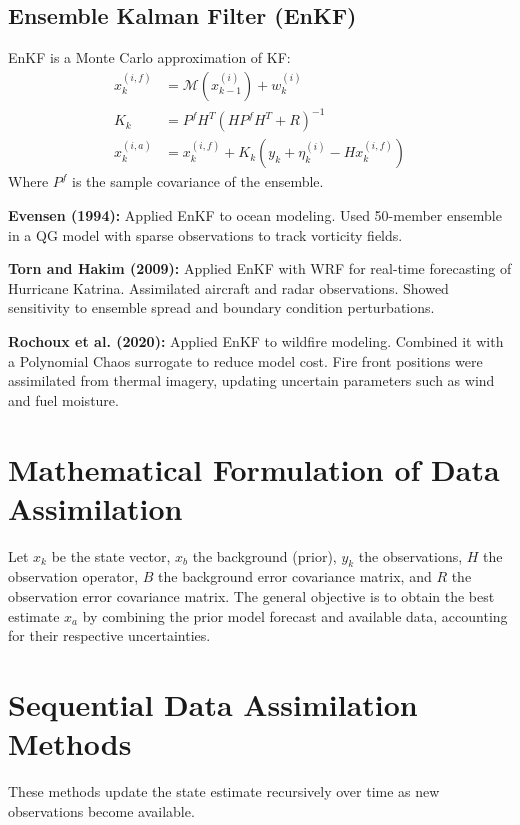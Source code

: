 \documentclass[a4paper]{article}
\begin{document}
\subsection{Ensemble Kalman Filter (EnKF)}

EnKF is a Monte Carlo approximation of KF:
\begin{align*}
x_k^{(i,f)} &= \mathcal{M}(x_{k-1}^{(i)}) + w_k^{(i)} \\
K_k &= P^f H^T (H P^f H^T + R)^{-1} \\
x_k^{(i,a)} &= x_k^{(i,f)} + K_k(y_k + \eta_k^{(i)} - H x_k^{(i,f)})
\end{align*}
Where $P^f$ is the sample covariance of the ensemble.

\textbf{Evensen (1994):} Applied EnKF to ocean modeling. Used 50-member ensemble in a QG model with sparse observations to track vorticity fields.

\textbf{Torn and Hakim (2009):} Applied EnKF with WRF for real-time forecasting of Hurricane Katrina. Assimilated aircraft and radar observations. Showed sensitivity to ensemble spread and boundary condition perturbations.

\textbf{Rochoux et al. (2020):} Applied EnKF to wildfire modeling. Combined it with a Polynomial Chaos surrogate to reduce model cost. Fire front positions were assimilated from thermal imagery, updating uncertain parameters such as wind and fuel moisture.




\section{Mathematical Formulation of Data Assimilation}

Let $x_k$ be the state vector, $x_b$ the background (prior), $y_k$ the observations, $H$ the observation operator, $B$ the background error covariance matrix, and $R$ the observation error covariance matrix. The general objective is to obtain the best estimate $x_a$ by combining the prior model forecast and available data, accounting for their respective uncertainties.

\section{Sequential Data Assimilation Methods}

These methods update the state estimate recursively over time as new observations become available.
\end{document}
